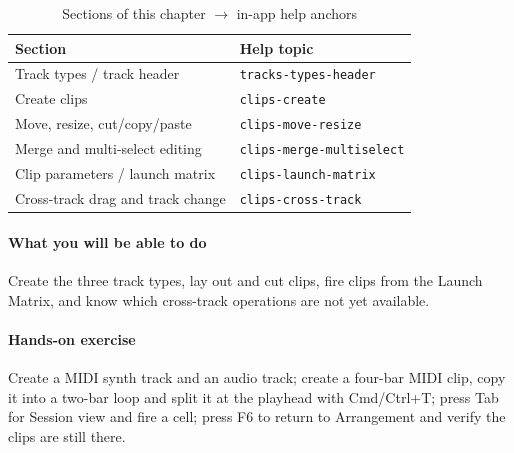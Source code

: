 \begin{table}[htbp]
\centering
\caption{Sections of this chapter $\to$ in-app help anchors}
\label{tab:ch03-help}
\begin{tabular}{ll}
\hline
Section & Help topic \\
\hline
Track types / track header & \texttt{tracks-types-header} \\
Create clips & \texttt{clips-create} \\
Move, resize, cut/copy/paste & \texttt{clips-move-resize} \\
Merge and multi-select editing & \texttt{clips-merge-multiselect} \\
Clip parameters / launch matrix & \texttt{clips-launch-matrix} \\
Cross-track drag and track change & \texttt{clips-cross-track} \\
\hline
\end{tabular}
\end{table}

\paragraph{What you will be able to do} Create the three track types, lay out and cut clips, fire clips from the Launch Matrix, and know which cross-track operations are not yet available.

\paragraph{Hands-on exercise} Create a MIDI synth track and an audio track; create a four-bar MIDI clip, copy it into a two-bar loop and split it at the playhead with Cmd/Ctrl+T; press Tab for Session view and fire a cell; press F6 to return to Arrangement and verify the clips are still there.
